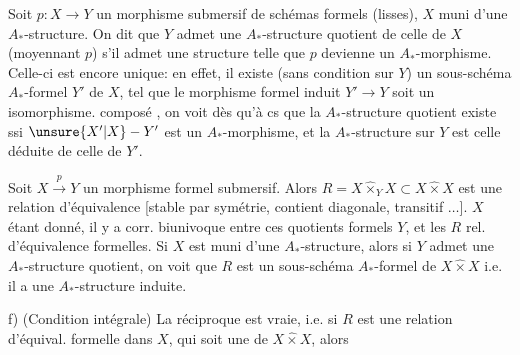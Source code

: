 Soit $p:X\to Y$ un morphisme submersif de schémas formels (lisses),  $X$ muni d'une $A_*$-structure. On dit que $Y$ admet une $A_*$-structure quotient de celle de $X$ (moyennant $p$) s'il admet une  structure telle que $p$ devienne un $A_*$-morphisme. Celle-ci est encore unique: en effet, il existe (sans condition sur $Y$) un  sous-schéma $A_*$-formel $Y'$ de $X$, tel que le morphisme formel induit $Y'\to Y$ soit un isomorphisme.   composé
, on voit dès qu'à cs que la $A_*$-structure quotient existe ssi $\unsure{X'|X}\mathbin{-}Y'$ est un $A_*$-morphisme, et la $A_*$-structure sur $Y$ est celle déduite de celle de $Y'$.

 Soit $X\xrightarrow{p}Y$ un morphisme formel submersif. Alors $R=X\mathbin{\hat\times}_Y X\subset X\mathbin{\hat\times}X$ est une  relation d'équivalence [stable par symétrie, contient diagonale, transitif $\ldots$].   $X$ étant donné, il y a corr. biunivoque entre ces quotients formels $Y$, et les $R$ rel. d'équivalence formelles. Si $X$ est muni d'une $A_*$-structure, alors si $Y$ admet une $A_*$-structure quotient, on voit que $R$ est un sous-schéma $A_*$-formel de $X\mathbin{\hat\times}X$ i.e. il a une $A_*$-structure induite.

f) (Condition intégrale) La réciproque est vraie, i.e. si $R$ est une relation d'équival. formelle dans $X$, qui soit une  de $X\mathbin{\hat\times}X$, alors
